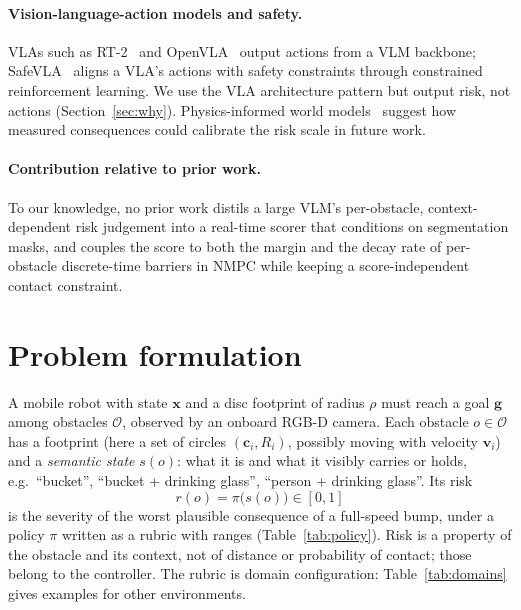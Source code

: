 \documentclass[10pt,a4paper]{article}
\begin{document}
\paragraph{Vision-language-action models and safety.} VLAs such as RT-2~\cite{zitkovich2023rt2} and OpenVLA~\cite{kim2024openvla}
output actions from a VLM backbone; SafeVLA~\cite{zhang2025safevla} aligns a VLA's actions with safety constraints through
constrained reinforcement learning. We use the VLA architecture pattern but output risk, not actions (Section~\ref{sec:why}).
Physics-informed world models~\cite{li2025pinwm} suggest how measured consequences could calibrate the risk scale in future work.

\paragraph{Contribution relative to prior work.} To our knowledge, no prior work distils a large VLM's per-obstacle, context-dependent
risk judgement into a real-time scorer that conditions on segmentation masks, and couples the score to both the margin and the
decay rate of per-obstacle discrete-time barriers in NMPC while keeping a score-independent contact constraint.

\section{Problem formulation}\label{sec:problem}

A mobile robot with state $\bm x$ and a disc footprint of radius $\rho$ must reach a goal $\bm g$ among obstacles $\mathcal O$, observed
by an onboard RGB-D camera. Each obstacle $o\in\mathcal O$ has a footprint (here a set of circles $(\bm c_i,R_i)$, possibly moving with
velocity $\bm v_i$) and a \emph{semantic state} $s(o)$: what it is and what it visibly carries or holds, e.g.\ ``bucket'',
``bucket + drinking glass'', ``person + drinking glass''. Its risk
\begin{equation}
r(o) = \pi\big(s(o)\big)\in[0,1]
\end{equation}
is the severity of the worst plausible consequence of a full-speed bump, under a policy $\pi$ written as a rubric with ranges
(Table~\ref{tab:policy}). Risk is a property of the obstacle and its context, not of distance or probability of contact; those
belong to the controller. The rubric is domain configuration: Table~\ref{tab:domains} gives examples for other environments.
\end{document}
